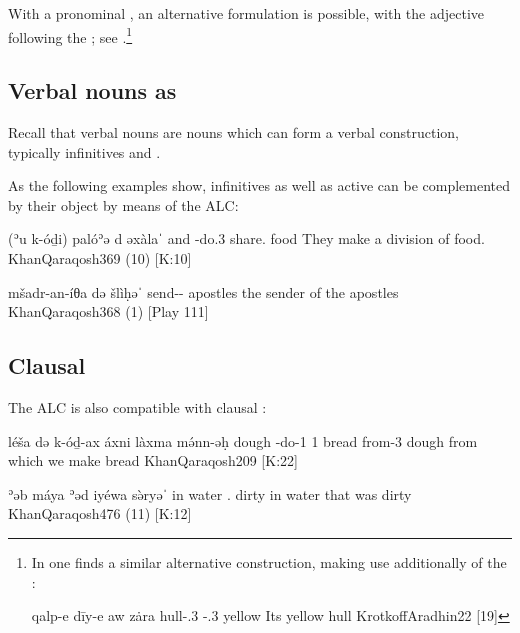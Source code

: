 With a pronominal \secn, an alternative formulation is possible, with the adjective following the ; see .\footnote{In \CArd one finds a similar alternative construction, making use additionally of the \lnk*:

{qalp-e dīy-e aw zȧra}
{hull-\poss.3\masc{} \lnk-\poss.3\masc{}  yellow}
{Its yellow hull}
{KrotkoffAradhin}{22 {[19]}}


}

\subsection{Verbal nouns as \prims}

Recall that verbal nouns are nouns which can form a verbal construction, typically infinitives and . 

As the following examples show, infinitives as well as active  can be complemented by their object by means of the ALC:

{(ʾu\cb{} k-óḏi) palóʾə d\cb{} əxàlaˈ}
{and\cb{} \ind-do.3\pl{} share.\inf{} \lnk\cb{} food}
{They make a division of food.\footnotemark}
{KhanQaraqosh}{369 (10) {[K:10]}} 


{mšadr-an-íθa də\cb{} šlìḥəˈ}
{send-\ptcp-\fem{} \lnk\cb{} apostles}
{the sender of the apostles}
{KhanQaraqosh}{368 (1) {[Play 111]}}


\subsection{Clausal \secns}
\label{ss:Qar_Clausal_Attr}

The ALC is also compatible with clausal \secns:


{léša də\cb{} k-óḏ-ax áxni làxma mə́nn-əḥ}
{dough \lnk\cb{} \ind-do-1\pl{} 1\pl{} bread from-3\masc}
{dough from which we make bread}
{KhanQaraqosh}{209 {[K:22]}}

{ʾəb\cb{} máya ʾəd\cb{} iyéwa sə̀ryəˈ}
	{in\cb{} water \lnk\cb{} \cop.\pst{} dirty}
{in water that was dirty}
{KhanQaraqosh}{476 (11) {[K:12]}}

